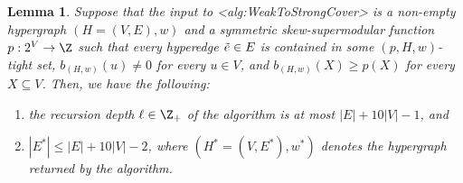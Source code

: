 \documentclass{article}
\def\Cref#1{<#1>}%
\newtheorem{lemma}{Lemma}[section]
\newcommand{\knote}[1]{{\color{red}[{\tiny Karthik: \bf #1}]\marginpar{\color{red}*}}}
\begin{document}
\begin{lemma}\label{lem:WeakToStrongCover:NumberOfHyperedges}
Suppose that the input to \Cref{alg:WeakToStrongCover} is a non-empty hypergraph $(H = (V, E), w)$ and a symmetric skew-supermodular function $p:2^V\rightarrow \Z$ 
such that every hyperedge $\Tilde{e} \in E$ is contained in some $(p, H, w)$-tight set, $b_{(H,w)}(u) \not = 0$ for every $u \in V$, and $b_{(H,w)}(X) \geq p(X)$ for every $X \subseteq V$. 
Then, we have the following:
    \begin{enumerate}
        \item the recursion depth $\ell \in \Z_+$ of the algorithm is at most $|E| + 10|V| - 1$, and
        \item $|E^*| \leq |E| + 10|V| - 2$, where $(H^* = (V, E^*), w^*)$ denotes the hypergraph returned by the algorithm.
    \end{enumerate}
\end{lemma}
\end{document}
